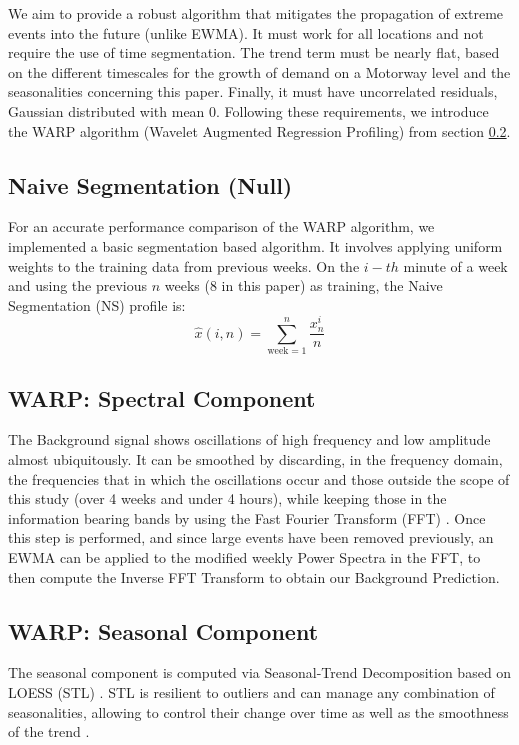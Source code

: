 \documentclass[a4paper, 10pt, conference]{ieeeconf}      %
\begin{document}
We aim to provide a robust algorithm that mitigates the propagation of extreme events into the future (unlike EWMA). 
It must work for all locations and not require the use of time segmentation. The trend term must be nearly flat, based on the different timescales for the growth of demand on a Motorway level and the seasonalities concerning this paper. 
Finally, it must have uncorrelated residuals, Gaussian distributed with mean 0.
Following these requirements, we introduce the WARP algorithm (Wavelet Augmented Regression Profiling) from section \ref{algostart}.
\subsection{Naive Segmentation (Null)}
For an accurate performance comparison of the WARP algorithm, we implemented a basic segmentation based algorithm. 
It involves applying uniform weights to the training data from previous weeks. 
On the $i-th$ minute of a week and using the previous $n$ weeks (8 in this paper) as training, the Naive Segmentation (NS) profile is:
\begin{equation}
\hat{x}(i,n) = \sum_{\textrm{week}=1}^{n} \frac{x^i_n}{n} 
\end{equation}

\subsection{WARP: Spectral Component}
\label{algostart}
The Background signal shows oscillations of high frequency and low amplitude almost ubiquitously. 
It can be smoothed by discarding, in the frequency domain, the frequencies that in which the oscillations occur and those outside the scope of this study (over 4 weeks and under 4 hours), while keeping those in the information bearing bands by using the Fast Fourier Transform (FFT) \cite{FFT}.
Once this step is performed, and since large events have been removed previously, an EWMA can be applied to the modified weekly Power Spectra in the FFT, to then compute the Inverse FFT Transform to obtain our Background Prediction.
\subsection{WARP: Seasonal Component}
The seasonal component is computed via Seasonal-Trend Decomposition based on LOESS (STL) \cite{STL}.
STL is resilient to outliers and can manage any combination of seasonalities, allowing to control their change over time as well as the smoothness of the trend \cite{forecasting}.
\end{document}
